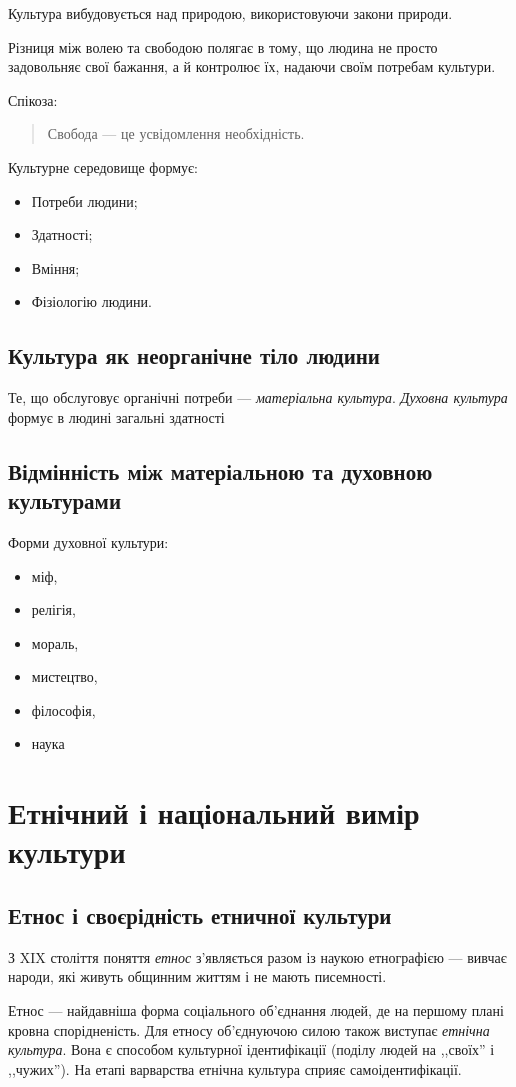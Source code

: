 \documentclass[a5paper,10pt,titlepage,pdftex,headsepline]{scrartcl}
\begin{document}
Культура вибудовується над природою, використовуючи закони природи.

Різниця між волею та свободою полягає в тому, що людина не просто задовольняє свої бажання, а й контролює їх, надаючи своїм потребам культури.

Спікоза: \begin{quote}
	Свобода --- це усвідомлення необхідність.
\end{quote}

Культурне середовище формує:
\begin{itemize}
	\item Потреби людини;
	\item Здатності;
	\item Вміння;
	\item Фізіологію людини.
\end{itemize}
\subsection{Культура як неорганічне тіло людини}
Те, що обслуговує органічні потреби --- \textit{матеріальна культура}.
\textit{Духовна культура} формує в людині загальні здатності
\subsection{Відмінність між матеріальною та духовною культурами}
Форми духовної культури:
\begin{itemize}
	\item міф,
	\item релігія,
	\item мораль,
	\item мистецтво,
	\item філософія,
	\item наука
\end{itemize}
\section{Етнічний і національний вимір культури}
\subsection{Етнос і своєрідність етничної культури}
З XIX століття поняття \textit{етнос} з’являється разом із наукою етнографією --- вивчає народи, які живуть общинним життям і не мають писемності.

Етнос --- найдавніша форма соціального об’єднання людей, де на першому плані кровна спорідненість.
Для етносу об’єднуючою силою також виступає \textit{етнічна культура}.
Вона є способом культурної ідентифікації (поділу людей на ,,своїх'' і ,,чужих'').
На етапі варварства етнічна культура сприяє самоідентифікації.
\end{document}
